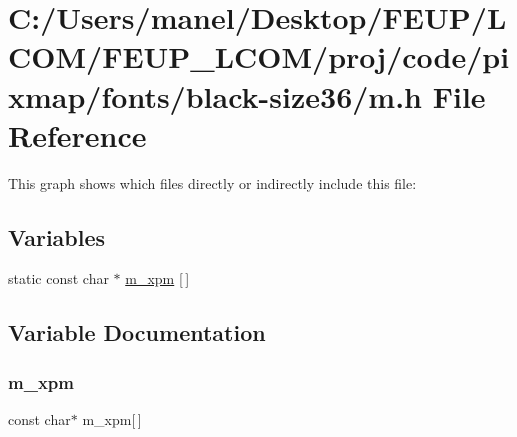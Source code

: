 \hypertarget{black-size36_2m_8h}{}\section{C\+:/\+Users/manel/\+Desktop/\+F\+E\+U\+P/\+L\+C\+O\+M/\+F\+E\+U\+P\+\_\+\+L\+C\+O\+M/proj/code/pixmap/fonts/black-\/size36/m.h File Reference}
\label{black-size36_2m_8h}
This graph shows which files directly or indirectly include this file\+:
\subsection*{Variables}
\begin{DoxyCompactItemize}
\item 
static const char $\ast$ \mbox{\hyperlink{black-size36_2m_8h_a5733c76febb8979b853e6a8c59942aea}{m\+\_\+xpm}} \mbox{[}$\,$\mbox{]}
\end{DoxyCompactItemize}


\subsection{Variable Documentation}
\mbox{\label{black-size36_2m_8h_a5733c76febb8979b853e6a8c59942aea}} 
\subsubsection{\texorpdfstring{m\_xpm}{m\_xpm}}
{\footnotesize\ttfamily const char$\ast$ m\+\_\+xpm\mbox{[}$\,$\mbox{]}\hspace{0.3cm}{\ttfamily [static]}}

